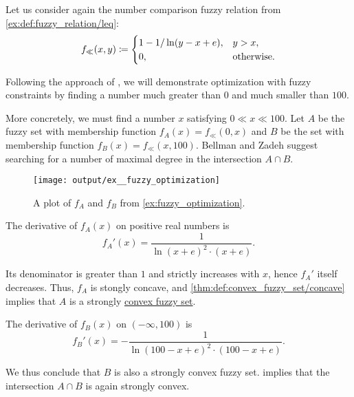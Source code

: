 \begin{example}\label{ex:fuzzy_optimization}
  Let us consider again the number comparison fuzzy relation from \cref{ex:def:fuzzy_relation/leq}:
  \begin{equation*}
    f_\ll(x, y) \coloneqq \begin{cases}
      1 - 1 / \ln(y - x + e), &y > x, \\
      0,                      &\T{otherwise.}
    \end{cases}
  \end{equation*}

  Following the approach of , we will demonstrate optimization with fuzzy constraints by finding a number much greater than \( 0 \) and much smaller than \( 100 \).

  More concretely, we must find a number \( x \) satisfying \( 0 \ll x \ll 100 \). Let \( A \) be the fuzzy set with membership function \( f_A(x) = f_\ll(0, x) \) and \( B \) be the set with membership function \( f_B(x) = f_\ll(x, 100) \). Bellman and Zadeh suggest searching for a number of maximal degree in the intersection \( A \cap B \).

  \begin{figure}[!ht]
    \centering
    \texttt{[image: output/ex\_\_fuzzy\_optimization]}
    \caption{A plot of \( f_A \) and \( f_B \) from \cref{ex:fuzzy_optimization}.}\label{fig:ex:fuzzy_optimization}
  \end{figure}

  The derivative of \( f_A(x) \) on positive real numbers is
  \begin{equation*}
    f_A'(x) = \frac 1 {\ln(x + e)^2 \cdot (x + e)}.
  \end{equation*}

  Its denominator is greater than \( 1 \) and strictly increases with \( x \), hence \( f_A' \) itself decreases. Thus, \( f_A \) is stongly concave, and \cref{thm:def:convex_fuzzy_set/concave} implies that \( A \) is a strongly \hyperref[def:convex_fuzzy_set]{convex fuzzy set}.

  The derivative of \( f_B(x) \) on \( (-\infty, 100) \) is
  \begin{equation*}
    f_B'(x) = -\frac 1 {\ln(100 - x + e)^2 \cdot (100 - x + e)}.
  \end{equation*}

  We thus conclude that \( B \) is also a strongly convex fuzzy set.  implies that the intersection \( A \cap B \) is again strongly convex.


\end{example}

